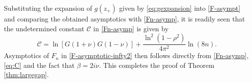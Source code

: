 \documentclass[11pt,a4paper]{article}
\numberwithin{equation}{section}
\begin{document}
Substituting the expansion of $g(z_+)$ given by \eqref{eq:gexpansion} into \eqref{F-asympt} and comparing the obtained asymptotics with \eqref{Fn-asymp}, it is readily seen that the undetermined constant $\mathcal {C}$ in \eqref{Fn-asymp} is given by
\begin{equation}\label{eq:C}
\mathcal{C}=\ln\left[G(1+\nu)G(1-\nu)\right]+\frac{\ln^2(1-\rho^2)}{4\pi^2}\ln(8n).
\end{equation}
Asymptotics of $F_n$ in \eqref{F-asymptotic-infty2} then follows directly from \eqref{Fn-asymp}, \eqref{eq:C} and the fact that $\beta=2i\nu$.
This completes the proof of Theorem \ref{thm:largegap}.













\end{document}
